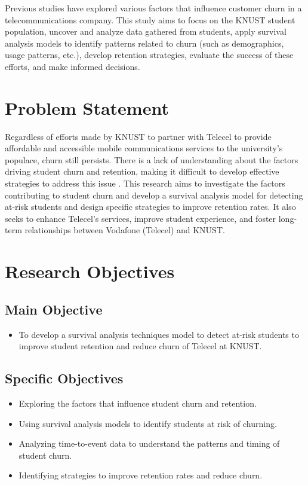 \documentclass[12pt]{report}
\begin{document}
Previous studies have explored various factors that influence customer churn in a telecommunications company. This study aims to focus on the KNUST student population, uncover and analyze data gathered from students, apply survival analysis models to identify patterns related to churn (such as demographics, usage patterns, etc.), develop retention strategies, evaluate the success of these efforts, and make informed decisions.

\section{Problem Statement}

Regardless of efforts made by KNUST to partner with Telecel to provide affordable and accessible mobile communications services to the university’s populace, churn still persists. There is a lack of understanding about the factors driving student churn and retention, making it difficult to develop effective strategies to address this issue \cite{kapur2018}. This research aims to investigate the factors contributing to student churn and develop a survival analysis model for detecting at-risk students and design specific strategies to improve retention rates. It also seeks to enhance Telecel’s services, improve student experience, and foster long-term relationships between Vodafone (Telecel) and KNUST.

\section{Research Objectives}

\subsection{Main Objective}
\begin{itemize}
    \item To develop a survival analysis techniques model to detect at-risk students to improve student retention and reduce churn of Telecel at KNUST.
\end{itemize}

\subsection{Specific Objectives}
\begin{itemize}
    \item Exploring the factors that influence student churn and retention.
    \item Using survival analysis models to identify students at risk of churning.
    \item Analyzing time-to-event data to understand the patterns and timing of student churn.
    \item Identifying strategies to improve retention rates and reduce churn.
\end{itemize}
\end{document}
